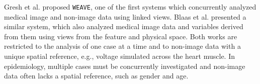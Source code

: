 \documentclass[journal]{style/vgtc} 			          %
\newcommand{\com}[1]{\textcolor{orange}{\uline{#1}}}
\begin{document}
Gresh et al. \cite{Gresh2000} proposed \texttt{WEAVE}, one of the first systems which concurrently analyzed medical image and non-image data using linked views.
%
Blaas et al. \cite{Blaas2007} presented a similar system, which also analyzed medical image data and variables derived from them using views from the feature and physical space.
%
Both works are restricted to the analysis of one case at a time and to non-image data with a unique spatial reference, e.g., voltage simulated across the heart muscle.
%
In epidemiology, multiple cases must be concurrently investigated and non-image data often lacks a spatial reference, such as gender and age.
%
\end{document}
